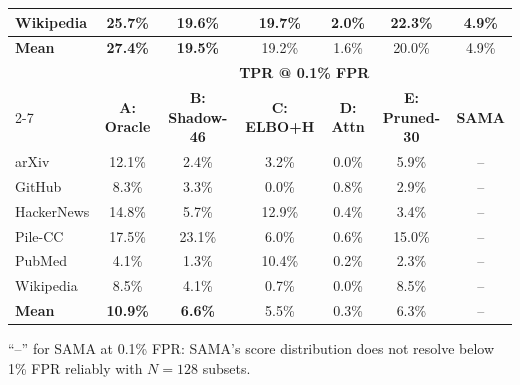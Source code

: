 \begin{table}[t]
\begin{tabular}{l ccccc c}
Wikipedia     & 25.7\% &  19.6\% & 19.7\% & 2.0\% & 22.3\% &  4.9\% \\
\midrule
\textbf{Mean} & \textbf{27.4\%} & \textbf{19.5\%} & 19.2\% & 1.6\% & 20.0\% & 4.9\% \\
\midrule
& \multicolumn{6}{c}{\textbf{TPR @ 0.1\% FPR}} \\
\cmidrule(lr){2-7}
& \textbf{A: Oracle} & \textbf{B: Shadow-46} & \textbf{C: ELBO+H} & \textbf{D: Attn} & \textbf{E: Pruned-30} & \textbf{SAMA} \\
\midrule
arXiv         & 12.1\% &  2.4\% &  3.2\% & 0.0\% &  5.9\% & -- \\
GitHub        &  8.3\% &  3.3\% &  0.0\% & 0.8\% &  2.9\% & -- \\
HackerNews    & 14.8\% &  5.7\% & 12.9\% & 0.4\% &  3.4\% & -- \\
Pile-CC       & 17.5\% & 23.1\% &  6.0\% & 0.6\% & 15.0\% & -- \\
PubMed        &  4.1\% &  1.3\% & 10.4\% & 0.2\% &  2.3\% & -- \\
Wikipedia     &  8.5\% &  4.1\% &  0.7\% & 0.0\% &  8.5\% & -- \\
\midrule
\textbf{Mean} & \textbf{10.9\%} & \textbf{6.6\%} & 5.5\% & 0.3\% & 6.3\% & -- \\
\bottomrule
\end{tabular}
{\footnotesize ``--'' for SAMA at 0.1\% FPR: SAMA's score distribution does not resolve below 1\% FPR reliably with $N=128$ subsets.}
\end{table}
